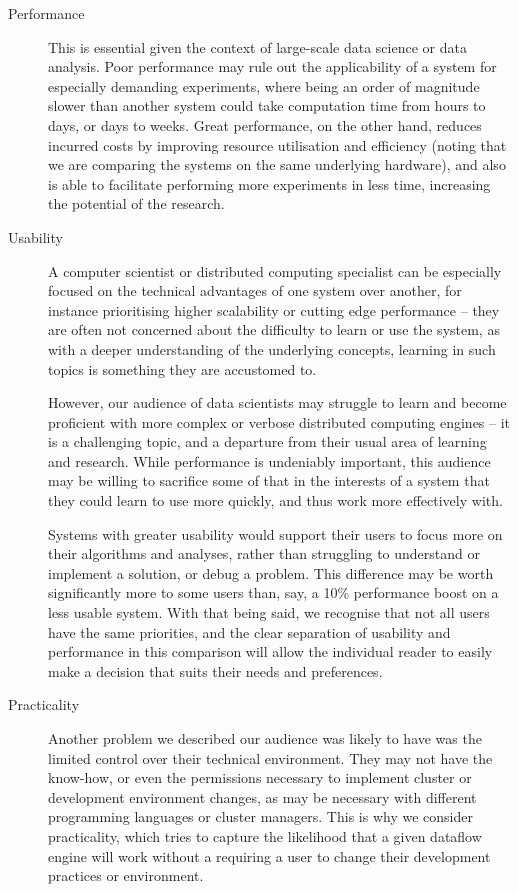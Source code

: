   \begin{description}
    \item[Performance]
      This is essential given the context of large-scale data science or data analysis. Poor performance may rule out the applicability of a system for especially demanding experiments, where being an order of magnitude slower than another system could take computation time from hours to days, or days to weeks. Great performance, on the other hand, reduces incurred costs by improving resource utilisation and efficiency (noting that we are comparing the systems on the same underlying hardware), and also is able to facilitate performing more experiments in less time, increasing the potential of the research.

    \item[Usability] 
      A computer scientist or distributed computing specialist can be especially focused on the technical advantages of one system over another, for instance prioritising higher scalability or cutting edge performance -- they are often not concerned about the difficulty to learn or use the system, as with a deeper understanding of the underlying concepts, learning in such topics is something they are accustomed to.

      However, our audience of data scientists may struggle to learn and become proficient with more complex or verbose distributed computing engines -- it is a challenging topic, and a departure from their usual area of learning and research. While performance is undeniably important, this audience may be willing to sacrifice some of that in the interests of a system that they could learn to use more quickly, and thus work more effectively with.
      
      Systems with greater usability would support their users to focus more on their algorithms and analyses, rather than struggling to understand or implement a solution, or debug a problem. This difference may be worth significantly more to some users than, say, a 10\% performance boost on a less usable system. With that being said, we recognise that not all users have the same priorities, and the clear separation of usability and performance in this comparison will allow the individual reader to easily make a decision that suits their needs and preferences.

    \item[Practicality]
      Another problem we described our audience was likely to have was the limited control over their technical environment. They may not have the know-how, or even the permissions necessary to implement cluster or development environment changes, as may be necessary with different programming languages or cluster managers. This is why we consider practicality, which tries to capture the likelihood that a given dataflow engine will work without a requiring a user to change their development practices or environment.


\end{description}
